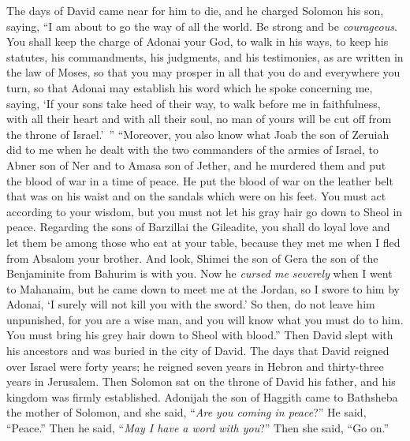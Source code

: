 \begin{biblechapter} %
 The days of David came near for him to die, and he charged Solomon his son, saying,
\verse “I am about to go the way of all the world. Be strong and be \textit{courageous}.
\verse You shall keep the charge of Adonai your God, to walk in his ways, to keep his statutes, his commandments, his judgments, and his testimonies, as are written in the law of Moses, so that you may prosper in all that you do and everywhere you turn,
\verse so that Adonai may establish his word which he spoke concerning me, saying, ‘If your sons take heed of their way, to walk before me in faithfulness, with all their heart and with all their soul, no man of yours will be cut off from the throne of Israel.’ ”
\verse “Moreover, you also know what Joab the son of Zeruiah did to me when he dealt with the two commanders of the armies of Israel, to Abner son of Ner and to Amasa son of Jether, and he murdered them and put the blood of war in a time of peace. He put the blood of war on the leather belt that was on his waist and on the sandals which were on his feet.
\verse You must act according to your wisdom, but you must not let his gray hair go down to Sheol in peace.
\verse Regarding the sons of Barzillai the Gileadite, you shall do loyal love and let them be among those who eat at your table, because they met me when I fled from Absalom your brother.
\verse And look, Shimei the son of Gera the son of the Benjaminite from Bahurim is with you. Now he \textit{cursed me severely} when I went to Mahanaim, but he came down to meet me at the Jordan, so I swore to him by Adonai, ‘I surely will not kill you with the sword.’
\verse So then, do not leave him unpunished, for you are a wise man, and you will know what you must do to him. You must bring his grey hair down to Sheol with blood.”
\verse Then David slept with his ancestors and was buried in the city of David.
\verse The days that David reigned over Israel were forty years; he reigned seven years in Hebron and thirty-three years in Jerusalem.
\verse Then Solomon sat on the throne of David his father, and his kingdom was firmly established.
 Adonijah the son of Haggith came to Bathsheba the mother of Solomon, and she said, “\textit{Are you coming in peace}?” He said, “Peace.”
\verse Then he said, “\textit{May I have a word with you}?” Then she said, “Go on.”

\end{biblechapter}
